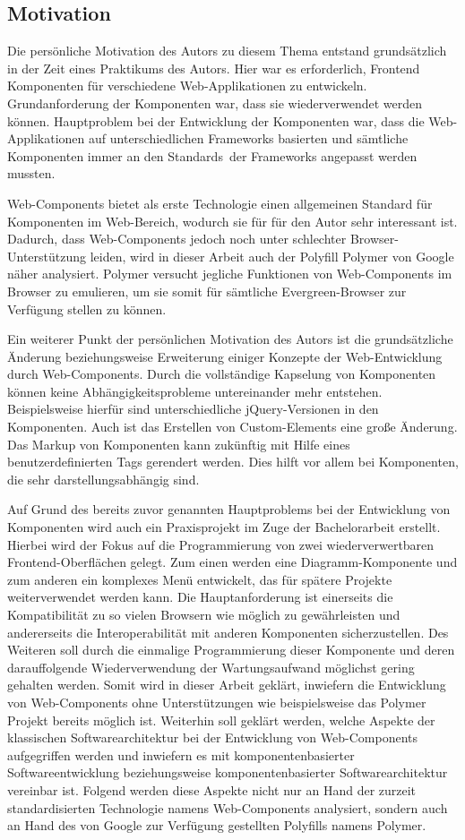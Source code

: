 \subsection{Motivation}
\label{sec:1_Motivation}

Die persönliche Motivation des Autors zu diesem Thema entstand grundsätzlich in der Zeit eines Praktikums des Autors. Hier war es erforderlich, Frontend Komponenten für verschiedene Web-Applikationen zu entwickeln. Grundanforderung der Komponenten war, dass sie wiederverwendet werden können. Hauptproblem bei der Entwicklung der Komponenten war, dass die Web-Applikationen auf unterschiedlichen Frameworks basierten und sämtliche Komponenten immer an den \glqq Standards\grqq\ der Frameworks angepasst werden mussten.

Web-Components bietet als erste Technologie einen allgemeinen Standard für Komponenten im Web-Bereich, wodurch sie für für den Autor sehr interessant ist. Dadurch, dass Web-Components jedoch noch unter schlechter Browser-Unterstützung leiden, wird in dieser Arbeit auch der Polyfill Polymer von Google näher analysiert. Polymer versucht jegliche Funktionen von Web-Components im Browser zu emulieren, um sie somit für sämtliche \glqq Evergreen\grqq -Browser zur Verfügung stellen zu können.

Ein weiterer Punkt der persönlichen Motivation des Autors ist die grundsätzliche Änderung beziehungsweise Erweiterung einiger Konzepte der Web-Entwicklung durch Web-Components. Durch die vollständige Kapselung von Komponenten können keine Abhängigkeitsprobleme untereinander mehr entstehen. Beispielsweise hierfür sind unterschiedliche jQuery-Versionen in den Komponenten. Auch ist das Erstellen von Custom-Elements eine große Änderung. Das Markup von Komponenten kann zukünftig mit Hilfe eines benutzerdefinierten Tags gerendert werden. Dies hilft vor allem bei Komponenten, die sehr darstellungsabhängig sind.

Auf Grund des bereits zuvor genannten Hauptproblems bei der Entwicklung von Komponenten wird auch ein Praxisprojekt im Zuge der Bachelorarbeit erstellt. Hierbei wird der Fokus auf die Programmierung von zwei wiederverwertbaren Frontend-Oberflächen gelegt. Zum einen werden eine Diagramm-Komponente und zum anderen ein komplexes Menü entwickelt, das für spätere Projekte weiterverwendet werden kann. Die Hauptanforderung ist einerseits die Kompatibilität zu so vielen Browsern wie möglich zu gewährleisten und andererseits die Interoperabilität mit anderen Komponenten sicherzustellen. Des Weiteren soll durch die einmalige Programmierung dieser Komponente und deren darauffolgende Wiederverwendung der Wartungsaufwand möglichst gering gehalten werden. Somit wird in dieser Arbeit geklärt, inwiefern die Entwicklung von Web-Components ohne Unterstützungen wie beispielsweise das Polymer Projekt bereits möglich ist. Weiterhin soll geklärt werden, welche Aspekte der klassischen Softwarearchitektur bei der Entwicklung von Web-Components aufgegriffen werden und inwiefern es mit komponentenbasierter Softwareentwicklung beziehungsweise komponentenbasierter Softwarearchitektur vereinbar ist. Folgend werden diese Aspekte nicht nur an Hand der zurzeit standardisierten Technologie namens Web-Components analysiert, sondern auch an Hand des von Google zur Verfügung gestellten Polyfills namens Polymer.

